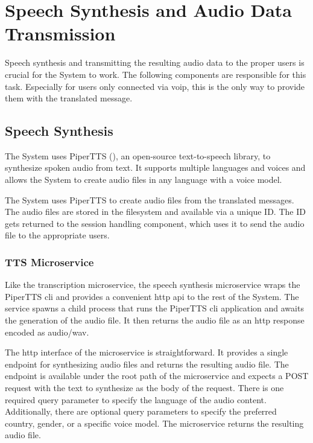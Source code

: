 \chapter{Speech Synthesis and Audio Data Transmission}

\label{SpeechSynthesisAndAudioDataTransmission}

Speech synthesis and transmitting the resulting audio data to the proper users is crucial for the System to work. The 
following components are responsible for this task. Especially for users only connected via \ac{voip}, this is the 
only way to provide them with the translated message.


\section{Speech Synthesis}

The System uses PiperTTS (\cite{rhasspy2023pipertts}), an open-source text-to-speech library, to synthesize spoken 
audio from text. It supports multiple languages and voices and allows the System to create audio files in any language 
with a voice model.

The System uses PiperTTS to create audio files from the translated messages. The audio files are stored in the 
filesystem and available via a unique ID. The ID gets returned to the session handling component, which uses it to send 
the audio file to the appropriate users.

\subsection{TTS Microservice}

Like the transcription microservice, the speech synthesis microservice wraps the PiperTTS \ac{cli} and provides a 
convenient \ac{http} \ac{api} to the rest of the System. The service spawns a child process that runs the 
PiperTTS \ac{cli} application and awaits the generation of the audio file. It then returns the audio file as an 
\ac{http} response encoded as audio/wav.

The \ac{http} interface of the microservice is straightforward. It provides a single endpoint for synthesizing audio 
files and returns the resulting audio file. The endpoint is available under the root path of the microservice and 
expects a POST request with the text to synthesize as the body of the request. There is one required query parameter to 
specify the language of the audio content. Additionally, there are optional query parameters to specify the preferred 
country, gender, or a specific voice model. The microservice returns the resulting audio file.


